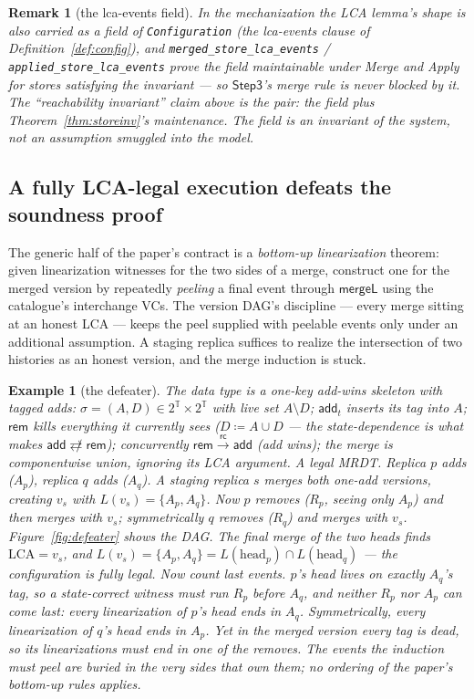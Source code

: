 \documentclass[11pt]{article}
\newtheorem{example}[theorem]{Example}
\newtheorem{remark}[theorem]{Remark}
\newcommand{\rc}{\xrightarrow{\mathsf{rc}}}      %
\newcommand{\ncomm}{\not\rightleftarrows}
\newcommand{\add}{\mathsf{add}}
\newcommand{\rem}{\mathsf{rem}}
\newcommand{\mergeL}{\mathsf{mergeL}}
\newcommand{\lean}[1]{\texttt{#1}}
\begin{document}
\begin{remark}[the lca-events field]
\label{rem:lcafield}
In the mechanization the LCA lemma's \emph{shape} is also carried as a
field of \lean{Configuration} (the lca-events clause of
Definition~\ref{def:config}), and \lean{merged\_store\_lca\_events} /
\lean{applied\_store\_lca\_events} prove the field maintainable under
Merge and Apply for stores satisfying the invariant --- so
$\mathsf{Step3}$'s merge rule is never blocked by it. The
``reachability invariant'' claim above is the pair: the field plus
Theorem~\ref{thm:storeinv}'s maintenance. The field is an invariant of
the system, not an assumption smuggled into the model.
\end{remark}

\subsection{A fully LCA-legal execution defeats the soundness proof}
\label{sec:defeater}

The generic half of the paper's contract is a \emph{bottom-up
linearization} theorem: given linearization witnesses for the two sides
of a merge, construct one for the merged version by repeatedly
\emph{peeling} a final event through $\mergeL$ using the catalogue's
interchange VCs. The version DAG's discipline --- every
merge sitting at an honest LCA --- keeps the peel supplied with peelable
events only under an additional assumption. A staging replica suffices to realize the
intersection of two histories as an honest version, and the merge
induction is stuck.

\begin{example}[the defeater]
\label{ex:defeater}
The data type is a one-key add-wins skeleton with tagged adds:
$\sigma = (A, D) \in 2^{\mathbb{T}} \times 2^{\mathbb{T}}$ with live set
$A \setminus D$; $\add_t$ inserts its tag into $A$; $\rem$ kills
everything it currently sees ($D \coloneqq A \cup D$ --- the
state-dependence is what makes $\add \ncomm \rem$); concurrently
$\rem \rc \add$ (add wins); the merge is componentwise union, ignoring
its LCA argument. A legal MRDT.
Replica $p$ adds ($A_p$), replica $q$ adds ($A_q$). A staging replica $s$
merges both one-add versions, creating $v_s$ with
$L(v_s) = \{A_p, A_q\}$. Now $p$ removes ($R_p$, seeing only $A_p$) and
then merges with $v_s$; symmetrically $q$ removes ($R_q$) and merges with
$v_s$. Figure~\ref{fig:defeater} shows the DAG. The final merge of the two
heads finds $\mathrm{LCA} = v_s$, and
$L(v_s) = \{A_p,A_q\} = L(\text{head}_p) \cap L(\text{head}_q)$ --- the
configuration is fully legal. Now count last events. $p$'s head lives on
exactly $A_q$'s tag, so a state-correct witness must run $R_p$ before
$A_q$, and neither $R_p$ nor $A_p$ can come last: every linearization of
$p$'s head ends in $A_q$. Symmetrically, every linearization of $q$'s
head ends in $A_p$. Yet in the \emph{merged} version every tag is dead,
so its linearizations must end in one of the removes.
The events the induction must peel are \emph{buried} in the very sides
that own them; no ordering of the paper's bottom-up rules applies.
\end{example}
\end{document}
